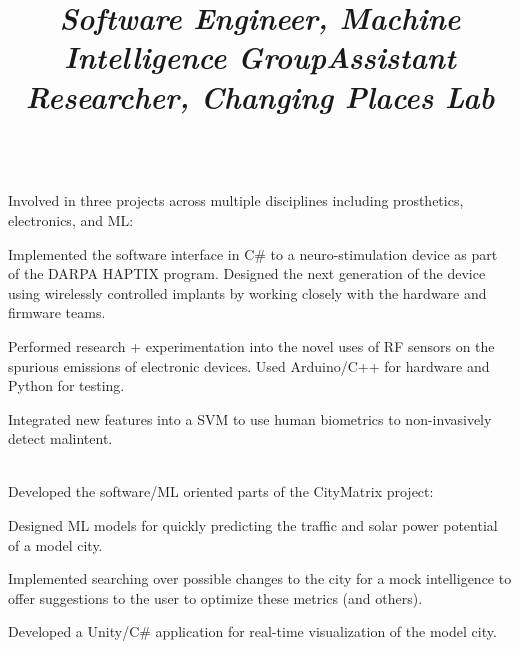 \documentclass[margin,line,11pt,letterpaper]{res}
\let\oldsection\section
\renewcommand{\section}[1]{\vspace{-2mm}\oldsection{\small\sc {#1}}}
\begin{document}
\begin{resume}
    \title{\textit{Software Engineer, Machine Intelligence Group}}
    \begin{position}
        \vspace{-3mm}\\
        Involved in three projects across multiple disciplines including prosthetics, electronics, and ML:
        \begin{list2}
            \item Implemented the software interface in C\# to a neuro-stimulation device as part of the DARPA HAPTIX program.
            Designed the next generation of the device using wirelessly controlled implants by working closely with the hardware and firmware teams. 
            \item Performed research + experimentation into the novel uses of RF sensors on the spurious emissions of electronic devices.
            Used Arduino/C++ for hardware and Python for testing.
            \item Integrated new features into a SVM to use human biometrics to non-invasively detect malintent.
        \end{list2}
    \end{position}
    
    \title{\textit{Assistant Researcher, Changing Places Lab}}
    \begin{position}
        \vspace{-3mm}\\
        Developed the software/ML oriented parts of the CityMatrix project:
        \begin{list2}
            \item Designed ML models for quickly predicting the traffic and solar power potential of a model city.
            \item Implemented searching over possible changes to the city for a mock intelligence to offer suggestions to the user to optimize these metrics (and others).
            \item Developed a Unity/C\# application for real-time visualization of the model city.
        \end{list2}
    \end{position}
    
    \section{Projects + Competitions}
    

\end{resume}
\end{document}
